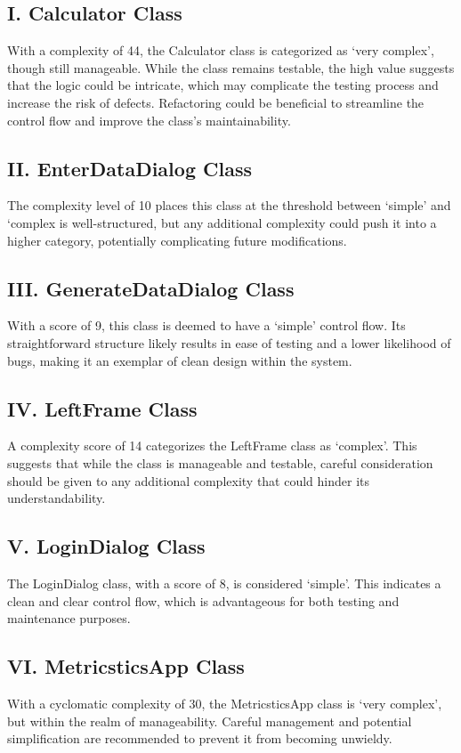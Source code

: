 \documentclass[english,12pt,a4paper]{report}
\begin{document}
	\subsection*{I. Calculator Class}
	With a complexity of 44, the Calculator class is categorized as `very complex', though still manageable. While the class remains testable, the high value suggests that the logic could be intricate, which may complicate the testing process and increase the risk of defects. Refactoring could be beneficial to streamline the control flow and improve the class's maintainability.
	
	\subsection*{II. EnterDataDialog Class}
	The complexity level of 10 places this class at the threshold between `simple' and `complex is well-structured, but any additional complexity could push it into a higher category, potentially complicating future modifications.
	
	\subsection*{III. GenerateDataDialog Class}
	With a score of 9, this class is deemed to have a `simple' control flow. Its straightforward structure likely results in ease of testing and a lower likelihood of bugs, making it an exemplar of clean design within the system.
	
	\subsection*{IV. LeftFrame Class}
	A complexity score of 14 categorizes the LeftFrame class as `complex'. This suggests that while the class is manageable and testable, careful consideration should be given to any additional complexity that could hinder its understandability.
	
	\subsection*{V. LoginDialog Class}
	The LoginDialog class, with a score of 8, is considered `simple'. This indicates a clean and clear control flow, which is advantageous for both testing and maintenance purposes.
	
	\subsection*{VI. MetricsticsApp Class}
	With a cyclomatic complexity of 30, the MetricsticsApp class is `very complex', but within the realm of manageability. Careful management and potential simplification are recommended to prevent it from becoming unwieldy.
	
\end{document}
